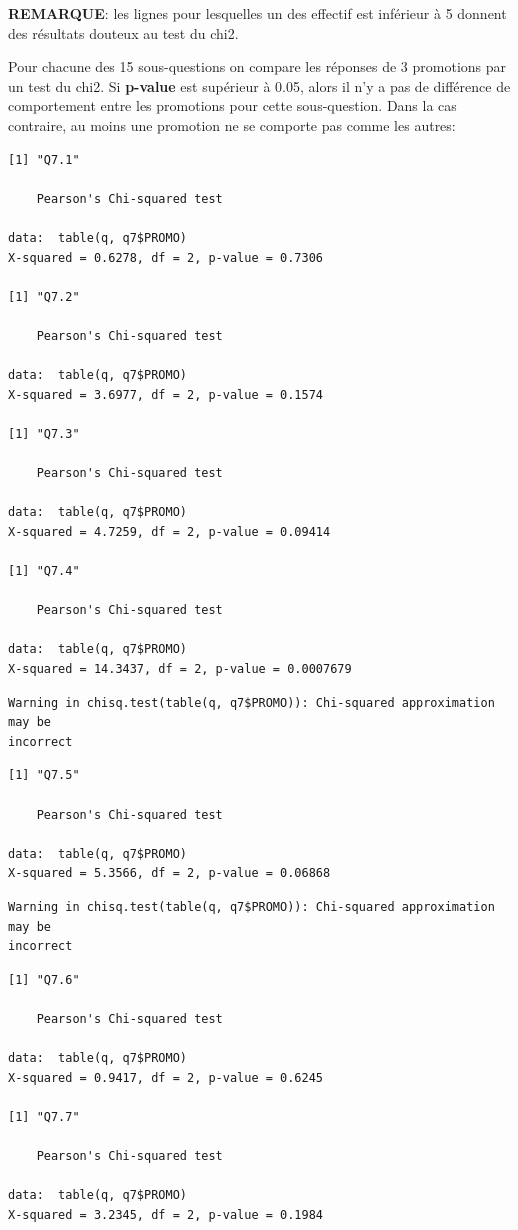 \documentclass[]{article}
\begin{document}
\textbf{REMARQUE}: les lignes pour lesquelles un des effectif est
inférieur à 5 donnent des résultats douteux au test du chi2.

Pour chacune des 15 sous-questions on compare les réponses de 3
promotions par un test du chi2. Si \textbf{p-value} est supérieur à
0.05, alors il n'y a pas de différence de comportement entre les
promotions pour cette sous-question. Dans la cas contraire, au moins une
promotion ne se comporte pas comme les autres:

\begin{verbatim}
[1] "Q7.1"

    Pearson's Chi-squared test

data:  table(q, q7$PROMO)
X-squared = 0.6278, df = 2, p-value = 0.7306

[1] "Q7.2"

    Pearson's Chi-squared test

data:  table(q, q7$PROMO)
X-squared = 3.6977, df = 2, p-value = 0.1574

[1] "Q7.3"

    Pearson's Chi-squared test

data:  table(q, q7$PROMO)
X-squared = 4.7259, df = 2, p-value = 0.09414

[1] "Q7.4"

    Pearson's Chi-squared test

data:  table(q, q7$PROMO)
X-squared = 14.3437, df = 2, p-value = 0.0007679
\end{verbatim}

\begin{verbatim}
Warning in chisq.test(table(q, q7$PROMO)): Chi-squared approximation may be
incorrect
\end{verbatim}

\begin{verbatim}
[1] "Q7.5"

    Pearson's Chi-squared test

data:  table(q, q7$PROMO)
X-squared = 5.3566, df = 2, p-value = 0.06868
\end{verbatim}

\begin{verbatim}
Warning in chisq.test(table(q, q7$PROMO)): Chi-squared approximation may be
incorrect
\end{verbatim}

\begin{verbatim}
[1] "Q7.6"

    Pearson's Chi-squared test

data:  table(q, q7$PROMO)
X-squared = 0.9417, df = 2, p-value = 0.6245

[1] "Q7.7"

    Pearson's Chi-squared test

data:  table(q, q7$PROMO)
X-squared = 3.2345, df = 2, p-value = 0.1984
\end{verbatim}
\end{document}
